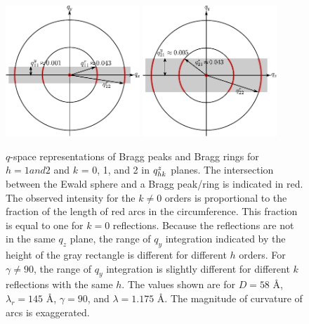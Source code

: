\begin{figure}[htbp]
  \centering
  \includegraphics[width=0.45\textwidth]{figures/ripple/analysis/ewald_side_h1_ver1}
  \includegraphics[width=0.45\textwidth]{figures/ripple/analysis/ewald_side_h2_ver1}
  \caption{$q$-space representations of Bragg peaks and Bragg rings 
  for $h=1 and 2$ and $k$ = 0, 1, and 2 in $q_{hk}^z$ planes.
  The intersection between the Ewald sphere and 
  a Bragg peak/ring is indicated in red. 
  The observed intensity for the $k\neq 0$ orders is proportional to
  the fraction of the length of red arcs in the circumference. This 
  fraction is equal to one for $k=0$ reflections.
  Because the reflections are not in the same $q_z$ plane, the range of $q_y$ 
  integration indicated by the height of the gray rectangle is different for different
  $h$ orders. For $\gamma\neq 90$\textdegree, the range of $q_y$ integration is
  slightly different for different $k$ reflections with the same $h$. 
  The values shown are for $D=58$ \AA, $\lambda_r=145$ \AA, $\gamma=90$\textdegree,
  and $\lambda=1.175$ \AA. The magnitude of curvature of arcs is exaggerated.}
  \label{fig:ewald_side}
\end{figure}

